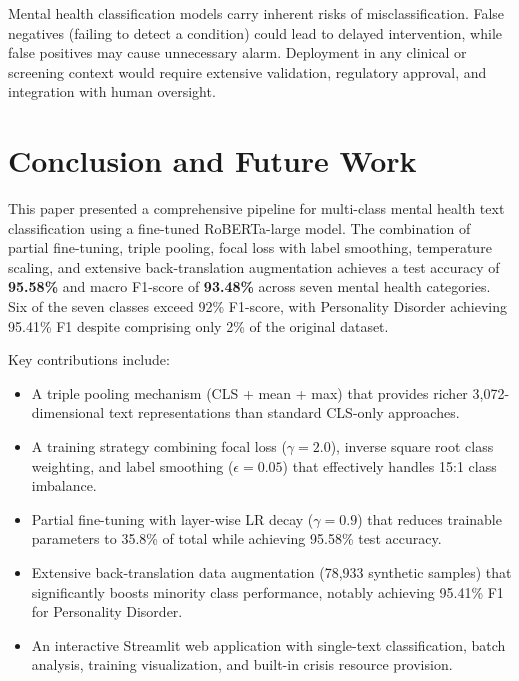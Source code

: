 \documentclass[conference, 10pt]{IEEEtran}
\begin{document}
Mental health classification models carry inherent risks of misclassification. False negatives (failing to detect a condition) could lead to delayed intervention, while false positives may cause unnecessary alarm. Deployment in any clinical or screening context would require extensive validation, regulatory approval, and integration with human oversight.


\section{Conclusion and Future Work}

This paper presented a comprehensive pipeline for multi-class mental health text classification using a fine-tuned RoBERTa-large model. The combination of partial fine-tuning, triple pooling, focal loss with label smoothing, temperature scaling, and extensive back-translation augmentation achieves a test accuracy of \textbf{95.58\%} and macro F1-score of \textbf{93.48\%} across seven mental health categories. Six of the seven classes exceed 92\% F1-score, with Personality Disorder achieving 95.41\% F1 despite comprising only 2\% of the original dataset.

Key contributions include:
\begin{itemize}[noitemsep]
    \item A triple pooling mechanism (CLS + mean + max) that provides richer 3,072-dimensional text representations than standard CLS-only approaches.
    \item A training strategy combining focal loss ($\gamma = 2.0$), inverse square root class weighting, and label smoothing ($\epsilon = 0.05$) that effectively handles 15:1 class imbalance.
    \item Partial fine-tuning with layer-wise LR decay ($\gamma = 0.9$) that reduces trainable parameters to 35.8\% of total while achieving 95.58\% test accuracy.
    \item Extensive back-translation data augmentation (78,933 synthetic samples) that significantly boosts minority class performance, notably achieving 95.41\% F1 for Personality Disorder.
    \item An interactive Streamlit web application with single-text classification, batch analysis, training visualization, and built-in crisis resource provision.
\end{itemize}
\end{document}
